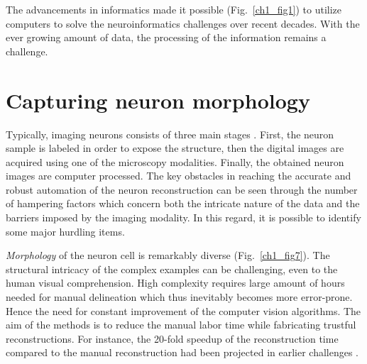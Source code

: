 The advancements in informatics made it possible (Fig.~\ref{ch1_fig1}) to utilize computers to solve the neuroinformatics challenges over recent decades. With the ever growing amount of data, the processing of the information remains a challenge.   

\section{Capturing neuron morphology}
Typically, imaging neurons consists of three main stages \cite{peng2015bigneuron}. First, the neuron sample is labeled in order to expose the structure, then the digital images are acquired using one of the microscopy modalities. Finally, the obtained neuron images are computer processed. The key obstacles in reaching the accurate and robust automation of the neuron reconstruction \cite{meijering2010neuron,donohue2011automated,acciai2016automated} can be seen through the number of hampering factors which concern both the intricate nature of the data and the barriers imposed by the imaging modality. In this regard, it is possible to identify some major hurdling items.

\textit{Morphology} of the neuron cell is remarkably diverse (Fig.~\ref{ch1_fig7}). The structural intricacy of the complex examples can be challenging, even to the human visual comprehension. High complexity requires large amount of hours needed for manual delineation which thus inevitably becomes more error-prone. Hence the need for constant improvement of the computer vision algorithms. The aim of the methods is to reduce the manual labor time while fabricating trustful reconstructions. For instance, the 20-fold speedup of the reconstruction time compared to the manual reconstruction had been projected in earlier challenges \cite{liu2011diadem}.

